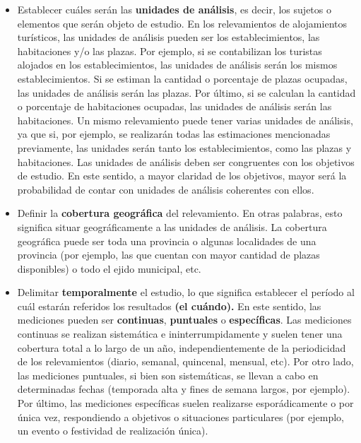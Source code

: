 \documentclass[
]{book}
\providecommand{\tightlist}{%
  \setlength{\itemsep}{0pt}\setlength{\parskip}{0pt}}
\begin{document}
\begin{itemize}
\tightlist
\item
  Establecer cuáles serán las \textbf{unidades de análisis}, es decir, los sujetos o elementos que serán objeto de estudio. En los relevamientos de alojamientos turísticos, las unidades de análisis pueden ser los establecimientos, las habitaciones y/o las plazas. Por ejemplo, si se contabilizan los turistas alojados en los establecimientos, las unidades de análisis serán los mismos establecimientos. Si se estiman la cantidad o porcentaje de plazas ocupadas, las unidades de análisis serán las plazas. Por último, si se calculan la cantidad o porcentaje de habitaciones ocupadas, las unidades de análisis serán las habitaciones. Un mismo relevamiento puede tener varias unidades de análisis, ya que si, por ejemplo, se realizarán todas las estimaciones mencionadas previamente, las unidades serán tanto los establecimientos, como las plazas y habitaciones. Las unidades de análisis deben ser congruentes con los objetivos de estudio. En este sentido, a mayor claridad de los objetivos, mayor será la probabilidad de contar con unidades de análisis coherentes con ellos.
\end{itemize}

\hfill\break

\begin{itemize}
\tightlist
\item
  Definir la \textbf{cobertura geográfica} del relevamiento. En otras palabras, esto significa situar geográficamente a las unidades de análisis. La cobertura geográfica puede ser toda una provincia o algunas localidades de una provincia (por ejemplo, las que cuentan con mayor cantidad de plazas disponibles) o todo el ejido municipal, etc.
\end{itemize}

\hfill\break

\begin{itemize}
\tightlist
\item
  Delimitar \textbf{temporalmente} el estudio, lo que significa establecer el período al cuál estarán referidos los resultados \textbf{(el cuándo).} En este sentido, las mediciones pueden ser \textbf{continuas}, \textbf{puntuales} o \textbf{específicas}. Las mediciones continuas se realizan sistemática e ininterrumpidamente y suelen tener una cobertura total a lo largo de un año, independientemente de la periodicidad de los relevamientos (diario, semanal, quincenal, mensual, etc). Por otro lado, las mediciones puntuales, si bien son sistemáticas, se llevan a cabo en determinadas fechas (temporada alta y fines de semana largos, por ejemplo). Por último, las mediciones específicas suelen realizarse esporádicamente o por única vez, respondiendo a objetivos o situaciones particulares (por ejemplo, un evento o festividad de realización única).
\end{itemize}
\end{document}
